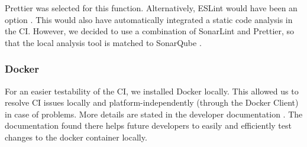 Prettier was selected for this function.
Alternatively, ESLint would have been an option \cite{eslint}.
This would also have automatically integrated a static code analysis in the CI.
However, we decided to use a combination of SonarLint and Prettier,
so that the local analysis tool is matched to SonarQube \cite{dev}.

\subsubsection{Docker}
For an easier testability of the CI, we installed Docker locally.
This allowed us to resolve CI issues locally and platform-independently (through the Docker Client) in case of problems.
More details are stated in the developer documentation \cite{dev}.
The documentation found there helps future developers to easily and efficiently test changes to the docker container locally. \\
